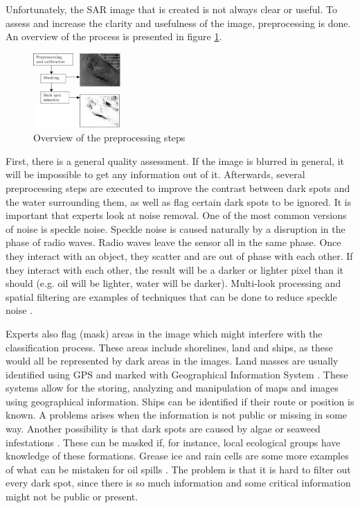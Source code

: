 Unfortunately, the SAR image that is created is not always clear or useful. To assess and increase the clarity and usefulness of the image, preprocessing is done. An overview of the process is presented in figure \ref{fig:overview}.

\begin{figure}[H]
	\centering
    \includegraphics[width=0.3\textwidth]{./img/preprocessing_diagram.png}
    \caption{\footnotesize{Overview of the preprocessing steps \cite{Solberg200745}}}
    \label{fig:overview}
\end{figure}

First, there is a general quality assessment. If the image is blurred in general, it will be impossible to get any information out of it.
Afterwards, several preprocessing steps are executed to improve the contrast between dark spots and the water surrounding them, as well as flag certain dark spots to be ignored. 
It is important that experts look at noise removal. One of the most common versions of noise is speckle noise. Speckle noise is caused naturally by a disruption in the phase of radio waves. Radio waves leave the sensor all in the same phase. Once they interact with an object, they scatter and are out of phase with each other. If they interact with each other, the result will be a darker or lighter pixel than it should (e.g. oil will be lighter, water will be darker). Multi-look processing and spatial filtering are examples of techniques that can be done to reduce speckle noise \cite{simard1998analysis}.

Experts also flag (mask) areas in the image which might interfere with the classification process. These areas include shorelines, land and ships, as these would all be represented by dark areas in the images. Land masses are usually identified using GPS and marked with Geographical Information System \cite{star1990geographic}. These systems allow for the storing, analyzing and manipulation of maps and images using geographical information. Ships can be identified if their route or position is known. A problems arises when the information is not public or missing in some way.
Another possibility is that dark spots are caused by algae or seaweed infestations \cite{fingas2014review}. These can be masked if, for instance, local ecological groups have knowledge of these formations. Grease ice and rain cells are some more examples of what can be mistaken for oil spills \cite{Brekke200595}. The problem is that it is hard to filter out every dark spot, since there is so much information and some critical information might not be public or present.

